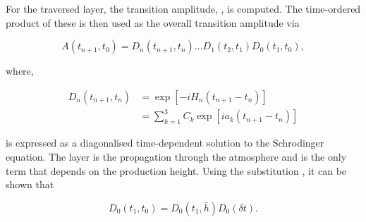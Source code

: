 For the  traversed layer, the transition amplitude, , is computed. The time-ordered product of these is then used as the overall transition amplitude via

\begin{equation}
  \label{eq:Oscillation_FullTransitionAmplitude}
  A(t_{n+1},t_{0}) = D_{n}(t_{n+1},t_{n})...D_{1}(t_{2},t_{1})D_{0}(t_{1},t_{0}),
\end{equation}

where,

\begin{equation}
  \label{eq:Oscillation_LayerTransitionAmplitude}
  \begin{split}
    D_{n}(t_{n+1},t_{n}) &= \exp[-i H_{n}(t_{n+1} - t_{n})] \\
    &= \sum^{3}_{k=1} C_{k} \exp[ia_{k} (t_{n+1} - t_{n})]
    \end{split}
\end{equation}

is expressed as a diagonalised time-dependent solution to the Schrodinger equation. The  layer is the propagation through the atmosphere and is the only term that depends on the production height. Using the substitution , it can be shown that

\begin{equation}
  D_{0}(t_{1},t_{0}) = D_{0}(t_{1},\bar{h})D_{0}(\delta t).
\end{equation}  

